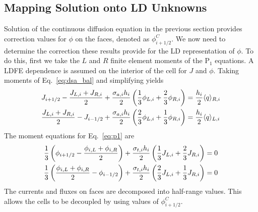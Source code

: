 \subsection{Mapping Solution onto LD Unknowns}

Solution of the continuous diffusion equation in the previous section provides
correction values for $\phi$ on the faces, denoted as $\phi_{i+1/2}^C$. We now need
to determine the correction these results provide for the LD representation of
$\phi$. To do this, first we take the $L$ and $R$ finite element moments of the P$_1$
equations.  A LDFE dependence is assumed on the interior of the cell for $J$ and
$\phi$.  Taking moments of Eq.~\eqref{eq:dsa_bal} and simplifying yields
\begin{align}
    J_{{i+1/2}} - \frac{J_{L,i} + J_{R,i}}{2} + \frac{\sigma_{a,i} h_i}{2} \left(\frac{1}{3} \phi_{L,i} +
    \frac{2}{3}\phi_{R,i}\right) &= \frac{h_i}{2} \langle q \rangle_{R,i} \\
    \frac{J_{L,i} + J_{R,i}}{2} - J_{i-1/2} + \frac{\sigma_{a,i} h_i}{2}
    \left(\frac{2}{3} \phi_{L,i} +
    \frac{1}{3}\phi_{R,i}\right) &= \frac{h_i}{2} \langle q \rangle_{L,i}
\end{align}
The moment equations for Eq.~\eqref{eq:p1} are
\begin{align}
    \frac{1}{3}\left(\phi_{{i+1/2}} - \frac{\phi_{i,L} + \phi_{i,R}}{2}\right) +
    \frac{\sigma_{t,i} h_i}{2} \left(\frac{1}{3} J_{L,i} + \frac{2}{3}J_{R,i}\right)
    &= 0 \\
    \frac{1}{3}\left(\frac{\phi_{i,L} + \phi_{i,R}}{2} - \phi_{i-1/2} \right) +
    \frac{\sigma_{t,i} h_i}{2} \left(\frac{2}{3} J_{L,i} + \frac{1}{3}J_{R,i}\right)
    &= 0 
\end{align}
The currents and fluxes on faces are decomposed into half-range values. This allows
the cells to be decoupled by using values of $\phi_{i+1/2}^C$. 

